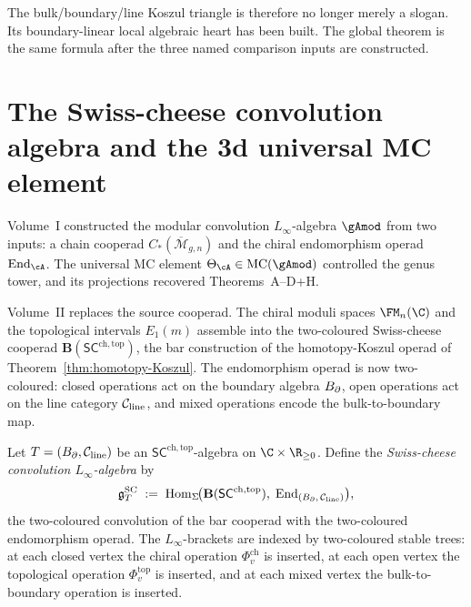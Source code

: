 The bulk/boundary/line Koszul triangle is therefore no longer merely a
slogan. Its boundary-linear local algebraic heart has been built. The
global theorem is the same formula after the three named comparison
inputs are constructed.

\section{The Swiss-cheese convolution algebra and the 3d universal
MC element}%

\providecommand{\ModEnv}{\operatorname{ModEnv}}
\providecommand{\Tr}{\operatorname{Tr}}
\providecommand{\ohat}{\widehat{\otimes}}
\providecommand{\Mbar}{\overline{\mathcal M}}
\providecommand{\Rring}{R^{\bullet}}
\providecommand{\gSC}{\mathfrak{g}^{\mathrm{SC}}}
\providecommand{\SCop}{\mathsf{SC}^{\mathrm{ch,top}}}
\providecommand{\ov}[1]{\overline{#1}}
\providecommand{\M}{\mathcal{M}}

Volume~I constructed the modular convolution $L_\infty$-algebra
$\gAmod$ from two inputs: a chain cooperad
$C_*(\Mbar_{g,n})$ and the chiral endomorphism operad
$\End_\cA$. The universal MC element
$\Theta_\cA \in \mc(\gAmod)$ controlled the
genus tower, and its projections recovered Theorems~A--D+H\@.

Volume~II replaces the source cooperad. The chiral moduli spaces
$\FM_n(\C)$ and the topological intervals $E_1(m)$ assemble into
the two-coloured Swiss-cheese cooperad
$\mathbf{B}(\SCop)$, the bar construction of the homotopy-Koszul
operad of Theorem~\ref{thm:homotopy-Koszul}.
The endomorphism operad is now two-coloured:
closed operations act on the boundary algebra $B_{\partial}$,
open operations act on the line category $\mathcal C_{\mathrm{line}}$,
and mixed operations encode the bulk-to-boundary map.

\begin{definition}
Let $T = (B_{\partial}, \mathcal C_{\mathrm{line}})$ be an $\SCop$-algebra
on $\C \times \R_{\ge 0}$. Define the \emph{Swiss-cheese
convolution $L_\infty$-algebra} by
\begin{equation}%
\gSC_T
\;:=\;
\Hom_{\Sigma}\!\bigl(
 \mathbf{B}(\SCop),\;
 \End_{(\Bbound,\,\cC_{\mathrm{line}})}
\bigr),
\end{equation}
the two-coloured convolution of the bar cooperad with the
two-coloured endomorphism operad. The $L_\infty$-brackets are
indexed by two-coloured stable trees: at each closed vertex the
chiral operation $\Phi_v^{\mathrm{ch}}$ is inserted, at each open
vertex the topological operation $\Phi_v^{\mathrm{top}}$ is
inserted, and at each mixed vertex the bulk-to-boundary operation
is inserted.
\end{definition}

